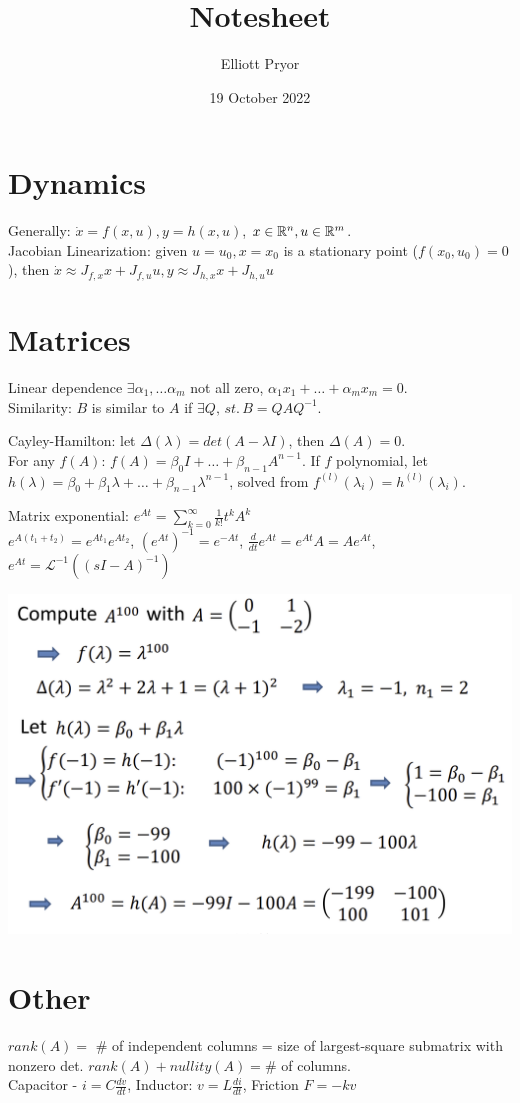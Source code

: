 \documentclass[11pt]{article}
\title{Notesheet}
\author{Elliott Pryor}
\date{19 October 2022}
\begin{document}

\section{Dynamics}
Generally: $\dot{x} = f(x,u), y = h(x,u)$, $x \in \mathbb{R}^n, u \in \mathbb{R}^m$.\\
Jacobian Linearization: given $u = u_0, x=x_0$ is a stationary point ($f(x_0, u_0) = 0$),
then $\dot{x} \approx J_{f,x}x + J_{f,u}u, y \approx J_{h,x}x + J_{h,u}u$ \\


\section{Matrices}
Linear dependence $\exists \alpha_1, \dots \alpha_m$ not all zero, $\alpha_1 x_1 + \dots + \alpha_m x_m = 0$.\\
Similarity: $B$ is similar to $A$ if $\exists Q, \, st. \, B = QAQ^{-1}$.


Cayley-Hamilton: let $\Delta(\lambda) = det(A - \lambda I)$, then $\Delta(A) = 0$.\\
For any $f(A)$: $f(A) = \beta_0 I + \dots + \beta_{n-1}A^{n-1}$.
If $f$ polynomial, let $h(\lambda) = \beta_0 + \beta_1 \lambda + \dots + \beta_{n-1} \lambda ^{n-1}$,
solved from $f^{(l)}(\lambda_i) = h^{(l)}(\lambda_i)$.

Matrix exponential: $e^{At} = \sum_{k=0}^\infty \frac{1}{k!} t^k A^k$\\
$e^{A(t_1 + t_2)} = e^{At_1}e^{At_2}$, $(e^{At})^{-1} = e^{-At}$, $\frac{d}{dt} e^{At} = e^{At}A = A e^{At}$,
$e^{At} = \mathcal{L}^{-1}((sI - A)^{-1})$

\begin{center}
    \includegraphics[width=0.9\linewidth]{cayleyhamilton.png}
\end{center}


\section{Other}

$rank(A) = $ \# of independent columns = size of largest-square submatrix with nonzero det.
$rank(A) + nullity(A) = $\# of columns. \\

Capacitor - $i = C \frac{dv}{dt}$, Inductor: $v = L \frac{di}{dt}$, Friction $F = -k v$
\end{document}
